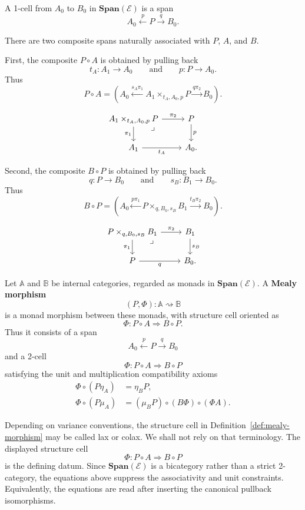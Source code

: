 A 1-cell from \(A_0\) to \(B_0\) in \(\mathbf{Span}(\mathcal E)\) is a span
\[
A_0\xleftarrow{p}P\xrightarrow{q}B_0.
\]

There are two composite spans naturally associated with \(P\), \(A\), and \(B\).

First, the composite \(P\circ A\) is obtained by pulling back
\[
t_A:A_1\to A_0
\qquad
\text{and}
\qquad
p:P\to A_0.
\]
Thus
\[
P\circ A
=
\left(
A_0
\xleftarrow{s_A\pi_1}
A_1\times_{t_A,A_0,p}P
\xrightarrow{q\pi_2}
B_0
\right).
\]

\[
\begin{tikzcd}
A_1\times_{t_A,A_0,p}P
\arrow[r, "\pi_2"]
\arrow[d, "\pi_1"']
\arrow[dr, phantom, "\lrcorner", very near start]
&
P \arrow[d, "p"]
\\
A_1 \arrow[r, "t_A"'] & A_0.
\end{tikzcd}
\]

Second, the composite \(B\circ P\) is obtained by pulling back
\[
q:P\to B_0
\qquad
\text{and}
\qquad
s_B:B_1\to B_0.
\]
Thus
\[
B\circ P
=
\left(
A_0
\xleftarrow{p\pi_1}
P\times_{q,B_0,s_B}B_1
\xrightarrow{t_B\pi_2}
B_0
\right).
\]

\[
\begin{tikzcd}
P\times_{q,B_0,s_B}B_1
\arrow[r, "\pi_2"]
\arrow[d, "\pi_1"']
\arrow[dr, phantom, "\lrcorner", very near start]
&
B_1 \arrow[d, "s_B"]
\\
P \arrow[r, "q"'] & B_0.
\end{tikzcd}
\]

\begin{definition}
\label{def:mealy-morphism}
Let \(\mathbb A\) and \(\mathbb B\) be internal categories, regarded as monads in \(\mathbf{Span}(\mathcal E)\). A \textbf{Mealy morphism}
\[
(P,\Phi):\mathbb A\rightsquigarrow\mathbb B
\]
is a monad morphism between these monads, with structure cell oriented as
\[
\Phi:P\circ A\Rightarrow B\circ P.
\]
Thus it consists of a span
\[
A_0\xleftarrow{p}P\xrightarrow{q}B_0
\]
and a 2-cell
\[
\Phi:
P\circ A\Rightarrow B\circ P
\]
satisfying the unit and multiplication compatibility axioms
\begin{align}
\Phi\circ(P\eta_A)&=\eta_B P,
\label{eq:mealy-unit-abstract}
\\
\Phi\circ(P\mu_A)
&=
(\mu_B P)\circ(B\Phi)\circ(\Phi A).
\label{eq:mealy-multiplication-abstract}
\end{align}
\end{definition}

\begin{remark}
\label{rem:lax-colax-convention}
Depending on variance conventions, the structure cell in Definition~\ref{def:mealy-morphism} may be called lax or colax. We shall not rely on that terminology. The displayed structure cell
\[
\Phi:P\circ A\Rightarrow B\circ P
\]
is the defining datum. Since \(\mathbf{Span}(\mathcal E)\) is a bicategory rather than a strict 2-category, the equations above suppress the associativity and unit constraints. Equivalently, the equations are read after inserting the canonical pullback isomorphisms.
\end{remark}

